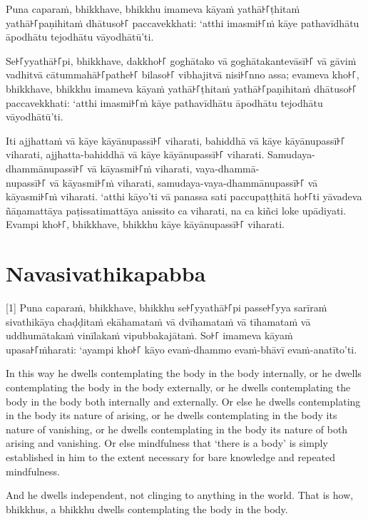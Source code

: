 Puna caparaṁ, bhikkhave, bhikkhu imameva kāyaṁ yathā꜔꜒ṭhitaṁ yathā꜔꜒paṇihitaṁ
dhātuso꜔꜒ paccavekkhati: ‘atthi imasmi꜔꜒ṁ kāye pathavīdhātu āpodhātu tejodhātu
vāyodhātū’ti.

Se꜔꜒yyathā꜔꜒pi, bhikkhave, dakkho꜔꜒ goghātako vā goghātakantevāsī꜔꜒ vā gāviṁ vadhitvā
cātummahā꜔꜒pathe꜔꜒ bilaso꜔꜒ vibhajitvā nisi꜔꜒nno assa; evameva kho꜔꜒, bhikkhave, bhikkhu
imameva kāyaṁ yathā꜔꜒ṭhitaṁ yathā꜔꜒paṇihitaṁ dhātuso꜔꜒ paccavekkhati: ‘atthi imasmi꜔꜒ṁ
kāye pathavīdhātu āpodhātu tejodhātu vāyodhātū’ti.

Iti ajjhattaṁ vā kāye kāyānupassī꜔꜒ viharati, bahiddhā vā kāye kāyānupassī꜔꜒
viharati, ajjhatta-bahiddhā vā kāye kāyānupassī꜔꜒ viharati. Samudaya-dhammānupassī꜔꜒
vā kāyasmi꜔꜒ṁ viharati, vaya-dhammā-\\
nupassī꜔꜒ vā kāyasmi꜔꜒ṁ viharati, samudaya-vaya-dhammānupassī꜔꜒ vā kāyasmi꜔꜒ṁ viharati.
‘atthi kāyo’ti vā panassa sati paccupaṭṭhitā ho꜔꜒ti yāvadeva ñāṇamattāya
paṭissatimattāya anissito ca viharati, na ca kiñci loke upādiyati. Evampi kho꜔꜒,
bhikkhave, bhikkhu kāye kāyānupassī꜔꜒ viharati.


\section*{Navasivathikapabba}

[1] Puna caparaṁ, bhikkhave, bhikkhu se꜔꜒yyathā꜔꜒pi passe꜔꜒yya sarīraṁ sivathikāya
chaḍḍitaṁ ekāhamataṁ vā dvīhamataṁ vā tīhamataṁ vā uddhumātakaṁ vinīlakaṁ
vipubbakajātaṁ. So꜔꜒ imameva kāyaṁ upasa꜔꜒ṁharati: ‘ayampi kho꜔꜒ kāyo evaṁ-dhammo
evaṁ-bhāvī evaṁ-anatīto’ti.

\englishPage

In this way he dwells contemplating the body in the body internally, or he
dwells contemplating the body in the body externally, or he dwells contemplating
the body in the body both internally and externally. Or else he dwells
contemplating in the body its nature of arising, or he dwells contemplating in
the body its nature of vanishing, or he dwells contemplating in the body its
nature of both arising and vanishing. Or else mindfulness that ‘there is a body’
is simply established in him to the extent necessary for bare knowledge and
repeated mindfulness.

And he dwells independent, not clinging to anything in the world. That is how,
bhikkhus, a bhikkhu dwells contemplating the body in the body.


